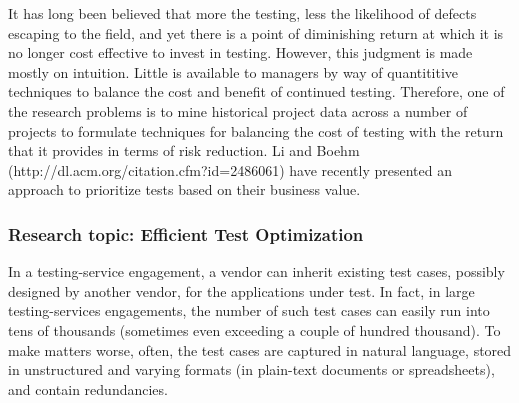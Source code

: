 It has long been believed that more the testing, less the likelihood of defects escaping
to the field, and yet there is a point of diminishing return at which it is no longer 
cost effective to invest in testing.  However, this judgment is
made mostly on intuition.  Little is available to managers by way of quantititive techniques
to balance the cost and benefit of continued testing.  Therefore, one of the
research problems is to mine historical project data across a number of projects
to formulate techniques for balancing the cost of testing with the return that it 
provides in terms of risk reduction.  Li and Boehm (http://dl.acm.org/citation.cfm?id=2486061) 
have recently presented an approach to prioritize tests based on their business value.


\subsubsection*{Research topic: Efficient Test Optimization}

In a testing-service engagement, a vendor can inherit existing test cases,
possibly designed by another vendor, for the applications under test. In fact,
in large testing-services engagements, the number of such test cases can easily
run into tens of thousands (sometimes even exceeding a couple of hundred
thousand).  To make matters worse, often, the test cases are captured in natural
language, stored in unstructured and varying formats (\eg in plain-text
documents or spreadsheets), and contain redundancies. 

